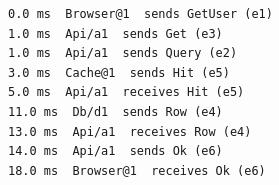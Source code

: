 \begin{lstlisting}[language={},basicstyle=\ttfamily\scriptsize,breaklines=true]
0.0 ms  Browser@1  sends GetUser (e1)
1.0 ms  Api/a1  sends Get (e3)
1.0 ms  Api/a1  sends Query (e2)
3.0 ms  Cache@1  sends Hit (e5)
5.0 ms  Api/a1  receives Hit (e5)
11.0 ms  Db/d1  sends Row (e4)
13.0 ms  Api/a1  receives Row (e4)
14.0 ms  Api/a1  sends Ok (e6)
18.0 ms  Browser@1  receives Ok (e6)
\end{lstlisting}
